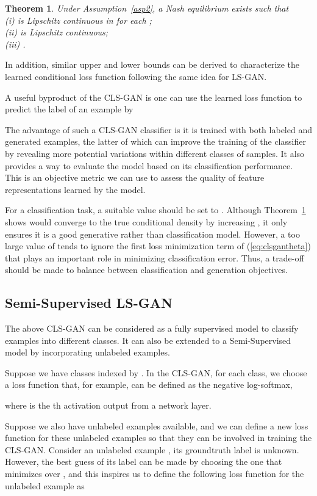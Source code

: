 \documentclass[11pt,fullpage, letterpaper,twoside]{article}
\newtheorem{theorem}{Theorem}
\newcommand{\1}[1]{\mathds{1}_{\left[#1\right]}}
\begin{document}
\begin{theorem}\label{thm4}
Under Assumption~\ref{asp2}, a Nash equilibrium  exists such that\\
(i)  is Lipschitz continuous in  for each ;\\
(ii)  is Lipschitz continuous;\\
(iii) .
\end{theorem}

In addition, similar upper and lower bounds can be derived to characterize the learned conditional loss function  following the same idea for LS-GAN.

A useful byproduct of the CLS-GAN is one can use the learned loss function  to predict the label of an example  by


The advantage of such a CLS-GAN classifier is it is trained with both labeled and generated examples, the latter of which can improve the training of the classifier by revealing more potential variations within different classes of samples. It also provides a way to evaluate the model based on its classification performance. This is an objective metric we can use to assess the quality of feature representations learned by the model.

For a classification task, a suitable value should be set to .  Although Theorem~\ref{thm4} shows  would converge to the true conditional density  by increasing , it only ensures it is a good generative rather than classification model.  However, a too large value of  tends to ignore the first loss minimization term of (\ref{eq:clsgantheta}) that plays an important role in minimizing classification error.  Thus, a trade-off should be made to balance between classification and generation objectives.



\subsection{Semi-Supervised LS-GAN}\label{sec:ssl}
The above CLS-GAN can be considered as a fully supervised model to classify examples into different classes.
It can also be extended to a Semi-Supervised model by incorporating unlabeled examples.

Suppose we have  classes indexed by . In the CLS-GAN, for each class, we choose a loss function that, for example, can be defined as the negative log-softmax,

where  is the th activation output from a network layer.

Suppose we also have unlabeled examples available, and we can define a new loss function for these unlabeled examples so that they can be involved in training the CLS-GAN. Consider an unlabeled example , its groundtruth label is unknown.  However, the best guess of its label can be made by choosing the one that minimizes  over , and this inspires us to define the following loss function for the unlabeled example as
\end{document}
